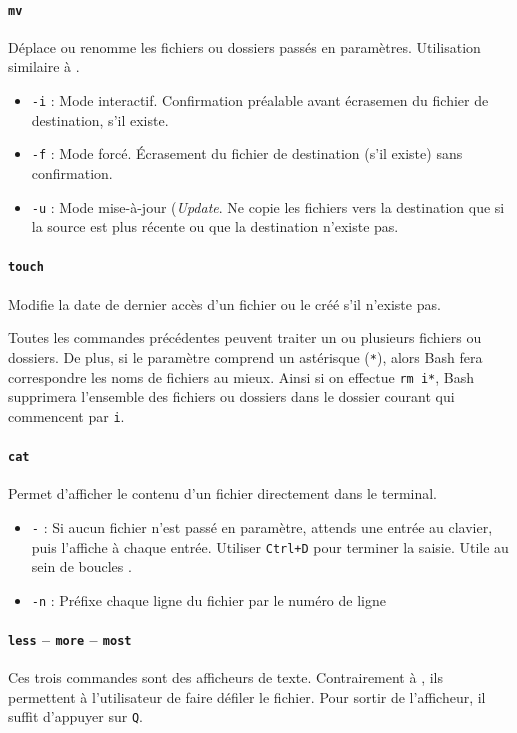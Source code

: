 \paragraph{\texttt{mv}} 
Déplace ou renomme les fichiers ou dossiers passés en paramètres. Utilisation similaire à .
\begin{itemize}
    \item \texttt{-i} : Mode interactif. Confirmation préalable avant écrasemen du fichier de destination, s'il existe.
    \item \texttt{-f} : Mode forcé. Écrasement du fichier de destination (s'il existe) sans confirmation.
    \item \texttt{-u} : Mode mise-à-jour (\textit{Update}. Ne copie les fichiers vers la destination que si la source est plus récente ou que la destination n'existe pas.
\end{itemize}

\paragraph{\texttt{touch}} 
Modifie la date de dernier accès d'un fichier ou le créé s'il n'existe pas.

Toutes les commandes précédentes peuvent traiter un ou plusieurs fichiers ou dossiers. De plus, si le paramètre comprend un astérisque (\texttt{*}), alors Bash fera correspondre les noms de fichiers au mieux. Ainsi si on effectue \texttt{rm i*}, Bash supprimera l'ensemble des fichiers ou dossiers dans le dossier courant qui commencent par \texttt{i}.

\paragraph{\texttt{cat}} 
Permet d'afficher le contenu d'un fichier directement dans le terminal.
\begin{itemize}
    \item \texttt{-} : Si aucun fichier n'est passé en paramètre, attends une entrée au clavier, puis l'affiche à chaque entrée. Utiliser \texttt{Ctrl+D} pour terminer la saisie. Utile au sein de boucles .
    \item \texttt{-n} : Préfixe chaque ligne du fichier par le numéro de ligne
\end{itemize}

\paragraph{\texttt{less} -- \texttt{more} -- \texttt{most}} 
Ces trois commandes sont des afficheurs de texte. Contrairement à , ils permettent à l'utilisateur de faire défiler le fichier. Pour sortir de l'afficheur, il suffit d'appuyer sur \texttt{Q}.

